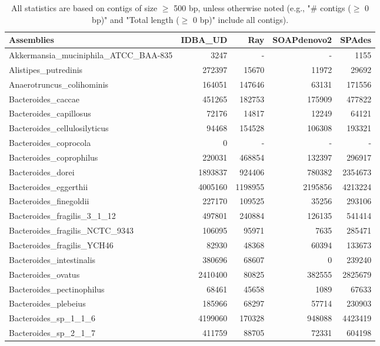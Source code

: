 \documentclass[12pt,a4paper]{article}
\begin{document}
\begin{table}[ht]
\begin{center}
\caption{All statistics are based on contigs of size $\geq$ 500 bp, unless otherwise noted (e.g., "\# contigs ($\geq$ 0 bp)" and "Total length ($\geq$ 0 bp)" include all contigs).}
\begin{tabular}{|l*{4}{|r}|}
\hline
Assemblies & IDBA\_UD & Ray & SOAPdenovo2 & SPAdes \\ \hline
Akkermansia\_muciniphila\_ATCC\_BAA-835 & 3247 & - & - & 1155 \\ \hline
Alistipes\_putredinis & 272397 & 15670 & 11972 & 29692 \\ \hline
Anaerotruncus\_colihominis & 164051 & 147646 & 63131 & 171556 \\ \hline
Bacteroides\_caccae & 451265 & 182753 & 175909 & 477822 \\ \hline
Bacteroides\_capillosus & 72176 & 14817 & 12249 & 64121 \\ \hline
Bacteroides\_cellulosilyticus & 94468 & 154528 & 106308 & 193321 \\ \hline
Bacteroides\_coprocola & 0 & - & - & - \\ \hline
Bacteroides\_coprophilus & 220031 & 468854 & 132397 & 296917 \\ \hline
Bacteroides\_dorei & 1893837 & 924406 & 780382 & 2354673 \\ \hline
Bacteroides\_eggerthii & 4005160 & 1198955 & 2195856 & 4213224 \\ \hline
Bacteroides\_finegoldii & 227170 & 109525 & 35256 & 293106 \\ \hline
Bacteroides\_fragilis\_3\_1\_12 & 497801 & 240884 & 126135 & 541414 \\ \hline
Bacteroides\_fragilis\_NCTC\_9343 & 106095 & 95971 & 7635 & 285471 \\ \hline
Bacteroides\_fragilis\_YCH46 & 82930 & 48368 & 60394 & 133673 \\ \hline
Bacteroides\_intestinalis & 380696 & 68607 & 0 & 239240 \\ \hline
Bacteroides\_ovatus & 2410400 & 80825 & 382555 & 2825679 \\ \hline
Bacteroides\_pectinophilus & 68461 & 45658 & 1089 & 67633 \\ \hline
Bacteroides\_plebeius & 185966 & 68297 & 57714 & 230903 \\ \hline
Bacteroides\_sp\_1\_1\_6 & 4199060 & 170328 & 948088 & 4423419 \\ \hline
Bacteroides\_sp\_2\_1\_7 & 411759 & 88705 & 72331 & 604198 \\ \hline

\end{tabular}
\end{center}
\end{table}
\end{document}
